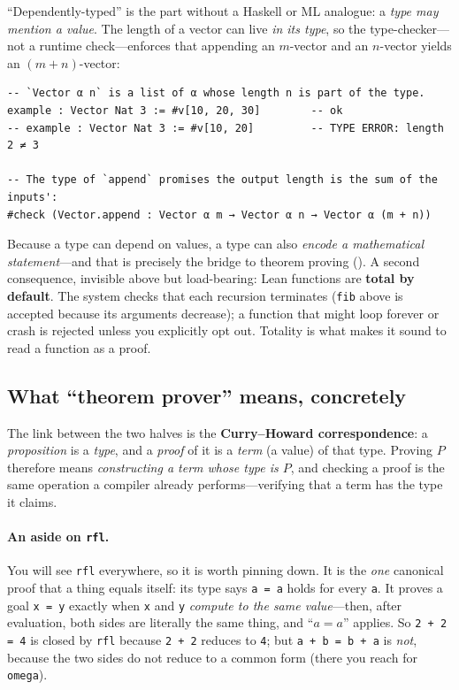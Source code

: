 \documentclass[11pt]{article}
\newcommand{\code}[1]{\lstinline[basicstyle=\ttfamily]|#1|}
\begin{document}
\noindent``Dependently-typed'' is the part without a Haskell or ML analogue: a
\emph{type may mention a value}. The length of a vector can live \emph{in its
type}, so the type-checker---not a runtime check---enforces that appending an
$m$-vector and an $n$-vector yields an $(m+n)$-vector:

\begin{lstlisting}
-- `Vector α n` is a list of α whose length n is part of the type.
example : Vector Nat 3 := #v[10, 20, 30]        -- ok
-- example : Vector Nat 3 := #v[10, 20]         -- TYPE ERROR: length 2 ≠ 3

-- The type of `append` promises the output length is the sum of the inputs':
#check (Vector.append : Vector α m → Vector α n → Vector α (m + n))
\end{lstlisting}

\noindent Because a type can depend on values, a type can also \emph{encode a
mathematical statement}---and that is precisely the bridge to theorem proving
(). A second consequence, invisible above but load-bearing:
Lean functions are \textbf{total by default}. The system checks that each
recursion terminates (\code{fib} above is accepted because its arguments
decrease); a function that might loop forever or crash is rejected unless you
explicitly opt out. Totality is what makes it sound to read a function as a
proof.

\subsection{What ``theorem prover'' means, concretely}\label{sec:prover}
The link between the two halves is the \textbf{Curry--Howard correspondence}: a
\emph{proposition} is a \emph{type}, and a \emph{proof} of it is a \emph{term}
(a value) of that type. Proving $P$ therefore means \emph{constructing a term
whose type is $P$}, and checking a proof is the same operation a compiler
already performs---verifying that a term has the type it claims.

\paragraph{An aside on \code{rfl}.} You will see \code{rfl} everywhere, so it is
worth pinning down. It is the \emph{one} canonical proof that a thing equals
itself: its type says \code{a = a} holds for every \code{a}. It proves a goal
\code{x = y} exactly when \code{x} and \code{y} \emph{compute to the same
value}---then, after evaluation, both sides are literally the same thing, and
``$a = a$'' applies. So \code{2 + 2 = 4} is closed by \code{rfl} because
\code{2 + 2} reduces to \code{4}; but \code{a + b = b + a} is \emph{not}, because
the two sides do not reduce to a common form (there you reach for \code{omega}).
\end{document}
